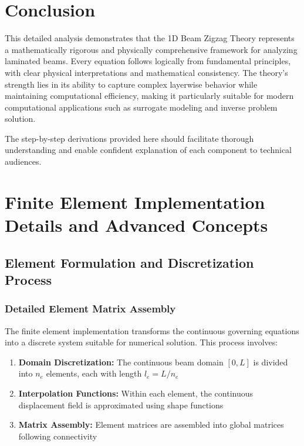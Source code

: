 \documentclass[12pt,a4paper]{article}
\begin{document}
\section{Conclusion}

This detailed analysis demonstrates that the 1D Beam Zigzag Theory represents a mathematically rigorous and physically comprehensive framework for analyzing laminated beams. Every equation follows logically from fundamental principles, with clear physical interpretations and mathematical consistency. The theory's strength lies in its ability to capture complex layerwise behavior while maintaining computational efficiency, making it particularly suitable for modern computational applications such as surrogate modeling and inverse problem solution.

The step-by-step derivations provided here should facilitate thorough understanding and enable confident explanation of each component to technical audiences.

\section{Finite Element Implementation Details and Advanced Concepts}

\subsection{Element Formulation and Discretization Process}

\subsubsection{Detailed Element Matrix Assembly}

The finite element implementation transforms the continuous governing equations into a discrete system suitable for numerical solution. This process involves:

\begin{enumerate}
\item \textbf{Domain Discretization:} The continuous beam domain $[0,L]$ is divided into $n_e$ elements, each with length $l_e = L/n_e$
\item \textbf{Interpolation Functions:} Within each element, the continuous displacement field is approximated using shape functions
\item \textbf{Matrix Assembly:} Element matrices are assembled into global matrices following connectivity
\end{enumerate}
\end{document}
